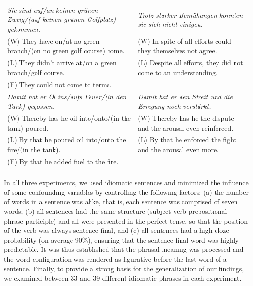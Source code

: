 \documentclass[output=paper]{langsci/langscibook}
\begin{document}
\begin{table}
\begin{tabularx}{\textwidth}{QQ}
\textit{Sie sind auf/an keinen grünen Zweig\slash (auf keinen grünen Golfplatz) gekommen.} & \textit{Trotz starker Bemühungen konnten sie sich nicht einigen.} \\
\hspace{3mm}(W) They have on/at no green branch\slash (on no green golf course) come.                  & \hspace{3mm}(W) In spite of all efforts could they themselves not agree.      \\
\hspace{3mm}(L) They didn’t arrive at/on a green branch\slash golf course.                             & \hspace{3mm}(L) Despite all efforts, they did not come to an understanding.   \\
\hspace{3mm}(F) They could not come to terms.                                                     &                                                                   \\ \tablevspace
\textit{Damit hat er Öl ins/aufs Feuer\slash (in den Tank) gegossen.}                      & \textit{Damit hat er den Streit und die Erregung noch verstärkt.} \\
\hspace{3mm}(W) Thereby has he oil into/onto\slash (in the tank) poured.                               & \hspace{3mm}(W) Thereby has he the dispute and the arousal even reinforced.   \\
\hspace{3mm}(L) By that he poured oil into/onto the fire\slash (in the tank).                          & \hspace{3mm}(L) By that he enforced the fight and the arousal even more.      \\
\hspace{3mm}(F) By that he added fuel to the fire.                                                &                                                                   \\ \lspbottomrule
\end{tabularx}
\end{table}

In all three experiments, we used idiomatic sentences and minimized the influence of some confounding variables by controlling the following factors: (a) the number of words in a sentence was alike, that is, each sentence was comprised of seven words; (b) all sentences had the same structure (subject-verb-prepositional phrase-participle) and all were presented in the perfect tense, so that the position of the verb was always sentence-final, and (c) all sentences had a high cloze probability (on average 90\%), ensuring that the sentence-final word was highly predictable. It was thus established that the phrasal meaning was processed and the word configuration was rendered as figurative before the last word of a sentence. Finally, to provide a strong basis for the generalization of our findings, we examined between 33 and 39 different idiomatic phrases in each experiment. 
\end{document}
